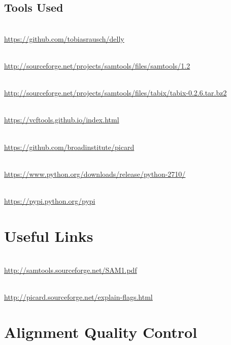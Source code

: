 \subsection{Tools Used}
\begin{description}[style=multiline,labelindent=0cm,align=left,leftmargin=0.5cm]
  \item[DELLY]\hfill\\
  	\url{https://github.com/tobiasrausch/delly}
  \item[Samtools]\hfill\\
  	\url{http://sourceforge.net/projects/samtools/files/samtools/1.2}
  \item[Tabix]\hfill\\
  	\url{http://sourceforge.net/projects/samtools/files/tabix/tabix-0.2.6.tar.bz2}
  \item[Vcftools]\hfill\\
  	\url{https://vcftools.github.io/index.html}
  \item[Picard]\hfill\\
  	\url{https://github.com/broadinstitute/picard}
  \item[Python2.7.10]\hfill\\
  	\url{https://www.python.org/downloads/release/python-2710/}
  \item[PyVCF Banyan numpy]\hfill\\
  	\url{https://pypi.python.org/pypi}
\end{description}

\section{Useful Links}
 
\begin{description}[style=multiline,labelindent=0cm,align=left,leftmargin=0.5cm]
  \item[SAM Specification]\hfill\\
    \url{http://samtools.sourceforge.net/SAM1.pdf}
  \item[Explain SAM Flags]\hfill\\
    \url{http://picard.sourceforge.net/explain-flags.html}
\end{description}

\clearpage

\section{Alignment Quality Control}

